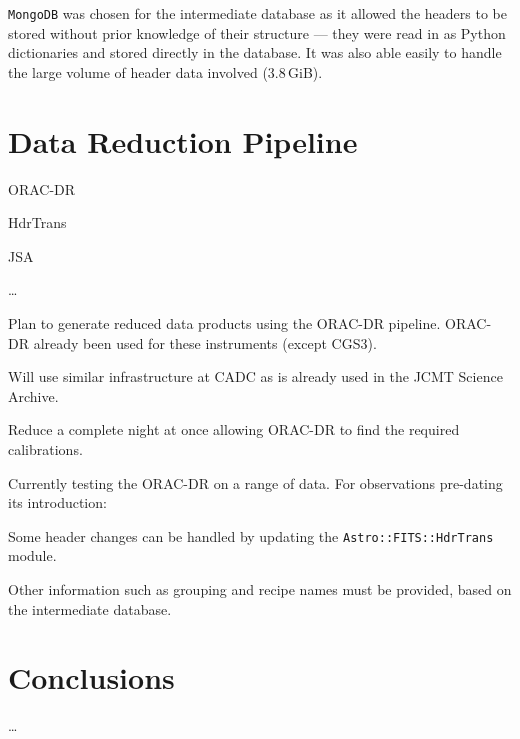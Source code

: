 \documentclass[11pt,twoside]{article}
\begin{document}
\texttt{MongoDB} was chosen for the intermediate database
as it allowed the
headers to be stored without prior knowledge of their structure
--- they were read in as Python dictionaries and
stored directly in the database.
It was also able easily to handle the large
volume of header data involved (3.8\,GiB).

\section{Data Reduction Pipeline}

ORAC-DR \citep{1999ASPC..172...11E,2008AN....329..295C}

HdrTrans \citep[section 2.2]{2008AN....329..295C}

JSA \citep{2011ASPC..442..203E}

\ldots

Plan to generate reduced data products using the ORAC-DR pipeline.
ORAC-DR already been used for these instruments (except CGS3).

Will use similar infrastructure at CADC as is already
used in the JCMT Science Archive.

Reduce a complete night at once allowing
ORAC-DR to find the required calibrations.

Currently testing the ORAC-DR on a range of data.
For observations pre-dating its introduction:

Some header changes can be handled by updating the
\texttt{Astro::FITS::HdrTrans} module.

Other information such as grouping and recipe names
must be provided, based on the intermediate database.


\section{Conclusions}

\ldots


\end{document}
